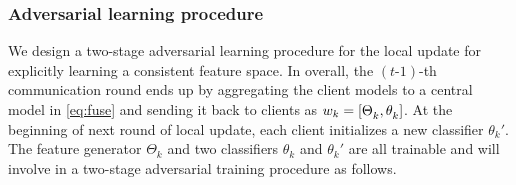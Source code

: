 

\subsubsection{Adversarial learning procedure}
We design a two-stage adversarial learning procedure for the local update for explicitly learning a consistent feature space.
In overall, the $(t\text{-}1)$-th communication round ends up by aggregating the
client models to a central model in \eqref{eq:fuse} and sending it back to clients as $w_k=[\Theta^{}_{k},\theta^{}_{k}]$. 
At the beginning of next round of local update, 
each client initializes a new classifier $\theta_k'$.
The feature generator $\Theta_k$ and two classifiers $\theta_k$ and $\theta_k'$ are all trainable and will involve in a two-stage adversarial training procedure as follows. 




